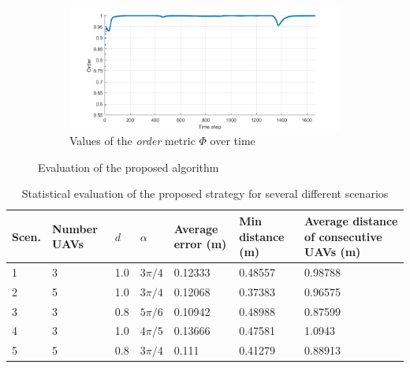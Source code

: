 \begin{figure}[t]
\begin{subfigure}[b]{0.49\textwidth}
    \label{fig:chap2_mean}
    \end{subfigure}
    \begin{subfigure}[b]{0.49\textwidth}
    \includegraphics[width=\textwidth]{paper1/images/heading.png}
    \caption{Values of the \textit{order} metric $\Phi$ over time}
    \label{fig:chap2_heading}
    \end{subfigure}
    \caption{Evaluation of the proposed algorithm}
    \label{fig:chap2_eval}
\end{figure}

\begin{table}[!]
\centering
\caption{Statistical evaluation of the proposed strategy for several different scenarios}
\label{tbl:chap2_sta}
\begin{tabular}{C{0.8cm}C{1.5cm}C{1cm}C{1cm}C{2cm}C{2.5cm}C{4.0cm}}
\hline
Scen. & Number UAVs & $d$ & $\alpha$    & Average error (m) & Min distance (m) & Average distance of consecutive UAVs (m) \\      & 3        & 1.0   & $3\pi/4$             & 0.12333   & 0.48557   & 0.98788                      \\
2     & 5        & 1.0   & $3\pi/4$    & 0.12068   & 0.37383   & 0.96575                      \\
3     & 3        & 0.8   & $5\pi/6$    & 0.10942   & 0.48988   & 0.87599                      \\
4     & 3        & 1.0   & $4\pi/5$    & 0.13666   & 0.47581   & 1.0943                       \\
5     & 5        & 0.8   & $3\pi/4$    & 0.111     & 0.41279   & 0.88913     \\ \hline                
\end{tabular}
\end{table}


